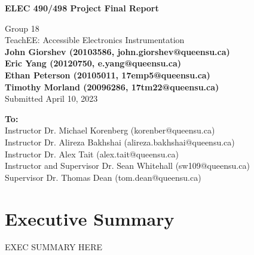 \documentclass[letterpaper,11pt]{article}
\begin{document}
\begin{titlepage}
    \begin{center}
        \vspace*{1cm}

        \Large
        \textbf{ELEC 490/498 Project Final Report}

        \vspace{0.5cm}
        Group 18\\
        TeachEE: Accessible Electronics Instrumentation\\
        \vspace{0.5cm}
        \normalsize
        \textbf{John Giorshev (20103586, john.giorshev@queensu.ca) \\ Eric Yang (20120750, e.yang@queensu.ca) \\ Ethan Peterson (20105011, 17emp5@queensu.ca) \\ Timothy Morland (20096286, 17tm22@queensu.ca)}\\
        \vspace{0.5cm}
        Submitted April 10, 2023\\

        \vfill
            
        \textbf{To:}\\
        Instructor Dr. Michael Korenberg (korenber@queensu.ca) \\
        Instructor Dr. Alireza Bakhshai (alireza.bakhshai@queensu.ca) \\
        Instructor Dr. Alex Tait (alex.tait@queensu.ca) \\
        Instructor and Supervisor Dr. Sean Whitehall (sw109@queensu.ca) \\
        Supervisor Dr. Thomas Dean (tom.dean@queensu.ca) \\
            
        \vspace{1.8cm}

    \end{center}
\end{titlepage}
\section*{Executive Summary}
EXEC SUMMARY HERE

\newpage

\tableofcontents
\listoffigures
\listoftables
\newpage
\end{document}
